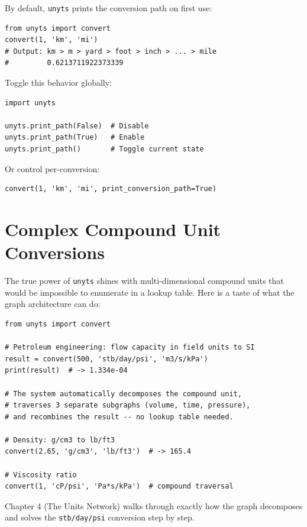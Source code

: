 \documentclass[11pt,a4paper]{report}
\begin{document}
By default, \texttt{unyts} prints the conversion path on first use:

\begin{lstlisting}[style=pythonstyle]
from unyts import convert
convert(1, 'km', 'mi')
# Output: km > m > yard > foot > inch > ... > mile
#         0.6213711922373339
\end{lstlisting}

Toggle this behavior globally:

\begin{lstlisting}[style=pythonstyle]
import unyts

unyts.print_path(False)  # Disable
unyts.print_path(True)   # Enable
unyts.print_path()       # Toggle current state
\end{lstlisting}

Or control per-conversion:

\begin{lstlisting}[style=pythonstyle]
convert(1, 'km', 'mi', print_conversion_path=True)
\end{lstlisting}

\section{Complex Compound Unit Conversions}

The true power of \texttt{unyts} shines with multi-dimensional compound units that would be impossible to enumerate in a lookup table. Here is a taste of what the graph architecture can do:

\begin{lstlisting}[style=pythonstyle]
from unyts import convert

# Petroleum engineering: flow capacity in field units to SI
result = convert(500, 'stb/day/psi', 'm3/s/kPa')
print(result)  # -> 1.334e-04

# The system automatically decomposes the compound unit,
# traverses 3 separate subgraphs (volume, time, pressure),
# and recombines the result -- no lookup table needed.

# Density: g/cm3 to lb/ft3
convert(2.65, 'g/cm3', 'lb/ft3')  # -> 165.4

# Viscosity ratio
convert(1, 'cP/psi', 'Pa*s/kPa')  # compound traversal
\end{lstlisting}

Chapter 4 (The Units Network) walks through exactly how the graph decomposes and solves the \texttt{stb/day/psi} conversion step by step.
\end{document}
